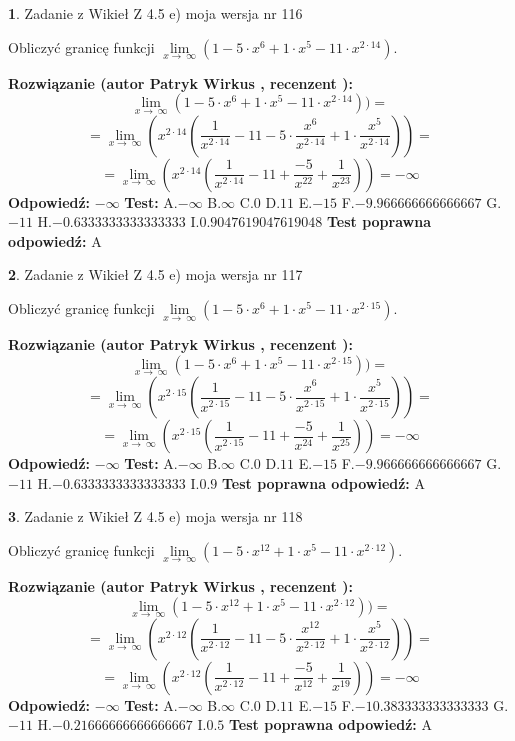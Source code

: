 \documentclass[12pt, a4paper]{article}
\theoremstyle{definition} %
\newtheorem{zad}{}
\newcommand{\zadStart}[1]{\begin{zad}#1\newline}
\newcommand{\zadStop}{\end{zad}}
\newcommand{\rozwStart}[2]{\noindent \textbf{Rozwiązanie (autor #1 , recenzent #2): }\newline}
\newcommand{\rozwStop}{\newline}
\newcommand{\odpStart}{\noindent \textbf{Odpowiedź:}\newline}
\newcommand{\odpStop}{\newline}
\newcommand{\testStart}{\noindent \textbf{Test:}\newline}
\newcommand{\testStop}{\newline}
\newcommand{\kluczStart}{\noindent \textbf{Test poprawna odpowiedź:}\newline}
\newcommand{\kluczStop}{\newline}
\begin{document}
\zadStart{Zadanie z Wikieł Z 4.5 e) moja wersja nr 116}


Obliczyć granicę funkcji  $\lim\limits_{x\to\ \infty}(1 - 5 \cdot x^{6}+1 \cdot x^{5}- 11 \cdot x^{2\cdot14})$.
\zadStop
\rozwStart{Patryk Wirkus}{}
$$\lim\limits_{x\to\ \infty}(1 - 5 \cdot x^{6}+1 \cdot x^{5}- 11 \cdot x^{2\cdot14}))=$$
$$=\lim\limits_{x\to\ \infty}(x^{2\cdot14}(\frac{1}{x^{2\cdot14}}-11 -5 \cdot \frac{x^{6}}{x^{2\cdot14}}+1 \cdot \frac{x^{5}}{x^{2\cdot14}}))=$$
$$=\lim\limits_{x\to\ \infty}(x^{2\cdot14}(\frac{1}{x^{2\cdot14}}-11 + \frac{-5}{x^{22}}+ \frac{1}{x^{23}}))=-\infty$$
\rozwStop
\odpStart
$-\infty$
\odpStop
\testStart
A.$-\infty$ B.$\infty$ C.$0$ D.$11$ E.$-15$
F.$-9.966666666666667$ G.$-11$
H.$-0.6333333333333333$
I.$0.9047619047619048$
\testStop
\kluczStart
A
\kluczStop



\zadStart{Zadanie z Wikieł Z 4.5 e) moja wersja nr 117}


Obliczyć granicę funkcji  $\lim\limits_{x\to\ \infty}(1 - 5 \cdot x^{6}+1 \cdot x^{5}- 11 \cdot x^{2\cdot15})$.
\zadStop
\rozwStart{Patryk Wirkus}{}
$$\lim\limits_{x\to\ \infty}(1 - 5 \cdot x^{6}+1 \cdot x^{5}- 11 \cdot x^{2\cdot15}))=$$
$$=\lim\limits_{x\to\ \infty}(x^{2\cdot15}(\frac{1}{x^{2\cdot15}}-11 -5 \cdot \frac{x^{6}}{x^{2\cdot15}}+1 \cdot \frac{x^{5}}{x^{2\cdot15}}))=$$
$$=\lim\limits_{x\to\ \infty}(x^{2\cdot15}(\frac{1}{x^{2\cdot15}}-11 + \frac{-5}{x^{24}}+ \frac{1}{x^{25}}))=-\infty$$
\rozwStop
\odpStart
$-\infty$
\odpStop
\testStart
A.$-\infty$ B.$\infty$ C.$0$ D.$11$ E.$-15$
F.$-9.966666666666667$ G.$-11$
H.$-0.6333333333333333$
I.$0.9$
\testStop
\kluczStart
A
\kluczStop



\zadStart{Zadanie z Wikieł Z 4.5 e) moja wersja nr 118}


Obliczyć granicę funkcji  $\lim\limits_{x\to\ \infty}(1 - 5 \cdot x^{12}+1 \cdot x^{5}- 11 \cdot x^{2\cdot12})$.
\zadStop
\rozwStart{Patryk Wirkus}{}
$$\lim\limits_{x\to\ \infty}(1 - 5 \cdot x^{12}+1 \cdot x^{5}- 11 \cdot x^{2\cdot12}))=$$
$$=\lim\limits_{x\to\ \infty}(x^{2\cdot12}(\frac{1}{x^{2\cdot12}}-11 -5 \cdot \frac{x^{12}}{x^{2\cdot12}}+1 \cdot \frac{x^{5}}{x^{2\cdot12}}))=$$
$$=\lim\limits_{x\to\ \infty}(x^{2\cdot12}(\frac{1}{x^{2\cdot12}}-11 + \frac{-5}{x^{12}}+ \frac{1}{x^{19}}))=-\infty$$
\rozwStop
\odpStart
$-\infty$
\odpStop
\testStart
A.$-\infty$ B.$\infty$ C.$0$ D.$11$ E.$-15$
F.$-10.383333333333333$ G.$-11$
H.$-0.21666666666666667$
I.$0.5$
\testStop
\kluczStart
A
\kluczStop
\end{document}
